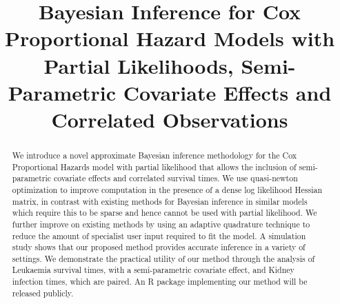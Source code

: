 \documentclass[ba]{imsart}
\begin{document}

\begin{frontmatter}
\title{Bayesian Inference for Cox Proportional Hazard Models with Partial Likelihoods, Semi-Parametric Covariate Effects and Correlated Observations}

\runtitle{}


\begin{abstract}
We introduce a novel approximate Bayesian inference methodology for the Cox Proportional Hazards model with partial likelihood that allows the inclusion of semi-parametric covariate effects and correlated survival times. We use quasi-newton optimization to improve computation in the presence of a dense log likelihood Hessian matrix, in contrast with existing methods for Bayesian inference in similar models which require this to be sparse and hence cannot be used with partial likelihood. We further improve on existing methods by using an adaptive quadrature technique to reduce the amount of specialist user input required to fit the model. A simulation study shows that our proposed method provides accurate inference in a variety of settings. We demonstrate the practical utility of our method through the analysis of Leukaemia survival times, with a semi-parametric covariate effect, and Kidney infection times, which are paired. An R package implementing our method will be released publicly.
\end{abstract}

\begin{keyword}
\end{keyword}

\end{frontmatter}
\end{document}
